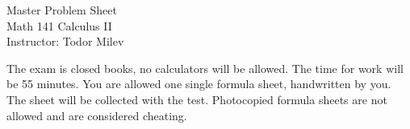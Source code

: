 \documentclass{article}
\begin{document}
\begin{center}
\Large
Master Problem Sheet \\ Math 141 Calculus II \\ \normalsize Instructor: Todor Milev
\end{center}


\noindent The exam is closed books, no calculators will be allowed. The time for work will be 55 minutes. You are allowed one single formula sheet, handwritten by you. The sheet will be collected with the test. Photocopied formula sheets are not allowed and are considered cheating.
\end{document}
